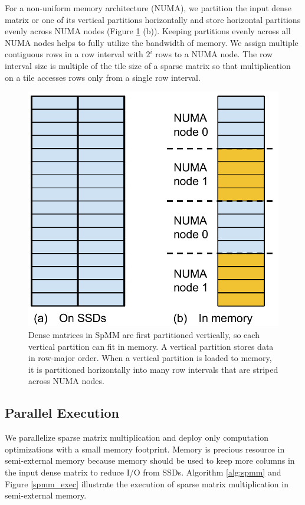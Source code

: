 For a non-uniform memory architecture (NUMA), we partition the input dense matrix
or one of its vertical partitions horizontally and store horizontal partitions
evenly across NUMA nodes (Figure \ref{dense_mat} (b)). Keeping partitions evenly
across all NUMA nodes helps to fully utilize the bandwidth of memory.
We assign multiple contiguous rows in a row interval with $2^i$ rows to
a NUMA node. The row interval size is multiple of the tile size of
a sparse matrix so that multiplication on a tile accesses rows only
from a single row interval.

\begin{figure}
\centering
\includegraphics[scale=0.4]{SpMM_figs/dense_matrix.pdf}
\caption{Dense matrices in SpMM are first partitioned
vertically, so each vertical partition can fit in memory. A vertical
partition stores data in row-major order. When a vertical partition is loaded
to memory, it is partitioned horizontally into many row intervals that
are striped across NUMA nodes.}
\label{dense_mat}
\end{figure}

\subsection{Parallel Execution} \label{sec:exec}
We parallelize sparse matrix multiplication and deploy only computation
optimizations with a small memory footprint. Memory is precious resource
in semi-external memory because memory should be used to keep more columns
in the input dense matrix to reduce I/O from SSDs.
Algorithm \ref{alg:spmm} and Figure \ref{spmm_exec} illustrate the execution of
sparse matrix multiplication in semi-external memory.

